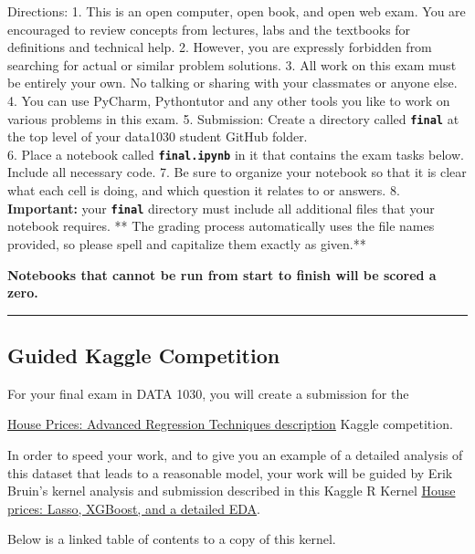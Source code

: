 \documentclass[11pt]{article}
\begin{document}
    Directions: 1. This is an open computer, open book, and open web exam.
You are encouraged to review concepts from lectures, labs and the
textbooks for definitions and technical help. 2. However, you are
expressly forbidden from searching for actual or similar problem
solutions. 3. All work on this exam must be entirely your own. No
talking or sharing with your classmates or anyone else. 4. You can use
PyCharm, Pythontutor and any other tools you like to work on various
problems in this exam. 5. Submission: Create a directory called
\textbf{\texttt{final}} at the top level of your data1030 student GitHub
folder.\\
6. Place a notebook called \textbf{\texttt{final.ipynb}} in it that
contains the exam tasks below. Include all necessary code. 7. Be sure to
organize your notebook so that it is clear what each cell is doing, and
which question it relates to or answers. 8. \textbf{Important:} your
\textbf{\texttt{final}} directory must include all additional files that
your notebook requires. ** The grading process automatically uses the
file names provided, so please spell and capitalize them exactly as
given.**

\textbf{Notebooks that cannot be run from start to finish will be scored
a zero.}

\begin{center}\rule{0.5\linewidth}{\linethickness}\end{center}

    \subsection{Guided Kaggle Competition}\label{guided-kaggle-competition}

For your final exam in DATA 1030, you will create a submission for the

\href{https://www.kaggle.com/erikbruin/house-prices-lasso-xgboost-and-a-detailed-eda}{House
Prices: Advanced Regression Techniques description} Kaggle competition.

In order to speed your work, and to give you an example of a detailed
analysis of this dataset that leads to a reasonable model, your work
will be guided by Erik Bruin's kernel analysis and submission described
in this Kaggle R Kernel
\href{https://www.kaggle.com/erikbruin/house-prices-lasso-xgboost-and-a-detailed-eda}{House
prices: Lasso, XGBoost, and a detailed EDA}.

Below is a linked table of contents to a copy of this kernel.
\end{document}
